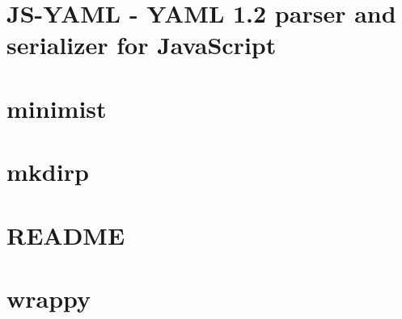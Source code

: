 \documentclass[twoside]{book}
\newcommand{\+}{\discretionary{\mbox{\scriptsize$\hookleftarrow$}}{}{}}
\begin{document}
\chapter{J\+S-\/\+Y\+A\+M\+L -\/ Y\+A\+M\+L 1.2 parser and serializer for Java\+Script}
\label{md__c_1__users_martin__documents__git_hub_visual_studio__bachelor__wis_r__wis_r_node_modules_ist9f2692b8310469b2e0c87ba1fe562cb7}
\hypertarget{md__c_1__users_martin__documents__git_hub_visual_studio__bachelor__wis_r__wis_r_node_modules_ist9f2692b8310469b2e0c87ba1fe562cb7}{}

\chapter{minimist}
\label{md__c_1__users_martin__documents__git_hub_visual_studio__bachelor__wis_r__wis_r_node_modules_ist3f448f0b215fdab1a9c0d01bbebef708}
\hypertarget{md__c_1__users_martin__documents__git_hub_visual_studio__bachelor__wis_r__wis_r_node_modules_ist3f448f0b215fdab1a9c0d01bbebef708}{}

\chapter{mkdirp}
\label{md__c_1__users_martin__documents__git_hub_visual_studio__bachelor__wis_r__wis_r_node_modules_istbfa0f281571ec5abd0a47e8eee2bb5cd}
\hypertarget{md__c_1__users_martin__documents__git_hub_visual_studio__bachelor__wis_r__wis_r_node_modules_istbfa0f281571ec5abd0a47e8eee2bb5cd}{}

\chapter{R\+E\+A\+D\+M\+E}
\label{md__c_1__users_martin__documents__git_hub_visual_studio__bachelor__wis_r__wis_r_node_modules_ist0228fa4ea075697464d9971ff0e01eb8}
\hypertarget{md__c_1__users_martin__documents__git_hub_visual_studio__bachelor__wis_r__wis_r_node_modules_ist0228fa4ea075697464d9971ff0e01eb8}{}

\chapter{wrappy}
\label{md__c_1__users_martin__documents__git_hub_visual_studio__bachelor__wis_r__wis_r_node_modules_ista20094e7d3477930b0c035b555bca1b2}
\hypertarget{md__c_1__users_martin__documents__git_hub_visual_studio__bachelor__wis_r__wis_r_node_modules_ista20094e7d3477930b0c035b555bca1b2}{}

\end{document}

